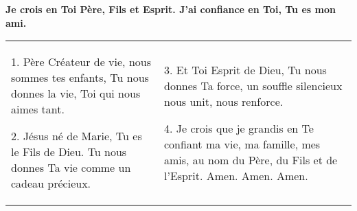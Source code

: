 \textbf{Je crois en Toi Père, Fils et Esprit. J’ai confiance en Toi, Tu es mon ami.}


\begin{tabular}{@{}p{} p{}@{}}
1. Père Créateur de vie, nous sommes tes enfants, Tu nous donnes la vie, 
  Toi qui nous aimes tant.

2. Jésus né de Marie, Tu es le Fils de Dieu. Tu nous 
  donnes Ta vie comme un cadeau précieux.
&
3. Et Toi Esprit de Dieu, Tu nous 
  donnes Ta force, un souffle silencieux nous unit, nous renforce.

4. Je crois 
 que je grandis en Te confiant ma vie, ma famille, mes amis, au nom du Père, 
  du Fils et de l’Esprit.
  Amen. Amen. Amen. 
\end{tabular}


